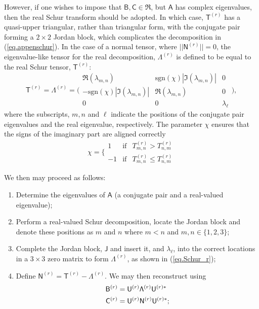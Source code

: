 \documentclass[preprint,amssymb,amsmath,aip,cha]{revtex4-1}
\begin{document}
However, if one wishes to impose that $\mathsf{B}, \mathsf{C} \in \Re$, but $\mathsf{A}$ has complex eigenvalues, then the real Schur transform should be adopted. In which case, $\mathsf{T}^{(r)}$ has a quasi-upper triangular, rather than triangular form, with the conjugate pair forming a $2 \times 2$ Jordan block, which complicates the decomposition in (\ref{eq.appenschur}).  In the case of a normal tensor, where $||\mathsf{N}^{(r)}|| = 0$, the eigenvalue-like tensor for the real decomposition, $\mathsf{\Lambda}^{(r)}$ is defined to be equal to the real Schur tensor, $\mathsf{T}^{(r)}$:
\begin{equation}
\mathsf{T}^{(r)} = \mathsf{\Lambda}^{(r)} = \biggl(\begin{smallmatrix} \Re(\lambda_{m,n}) & \mbox{sgn}(\chi)|\Im(\lambda_{m,n})| & 0\\ -\mbox{sgn}(\chi)|\Im(\lambda_{m,n})| & \Re(\lambda_{m,n}) & 0 \\ 0 & 0 & \lambda_{\ell}\end{smallmatrix} \biggr),
\label{eq.Schur_r}
\end{equation}  
where the subscripts, $m, n$ and $\ell$ indicate the positions of the conjugate pair eigenvalues and the real eigenvalue, respectively. The parameter $\chi$ ensures that the signs of the imaginary part are aligned correctly
\begin{equation}
\chi =  \biggl\{\begin{smallmatrix} 1 & \mbox{if} & T^{(r)}_{m,n} > T^{(r)}_{n,m}\\
-1 & \mbox{if} & T^{(r)}_{m,n} \le T^{(r)}_{n,m}\end{smallmatrix}
\end{equation}

We then may proceed as follows:
\begin{enumerate}
\item Determine the eigenvalues of $\mathsf{A}$ (a conjugate pair and a real-valued eigenvalue);
\item Perform a real-valued Schur decomposition, locate the Jordan block and denote these positions as $m$ and $n$ where $m < n$ and $m,n \in \{1,2,3\}$;
\item Complete the Jordan block, $\mathsf{J}$ and insert it, and $\lambda_{\ell}$, into the correct locations in a $3 \times 3$ zero matrix to form $\mathsf{\Lambda}^{(r)}$, as shown in (\ref{eq.Schur_r}); 
\item Define $\mathsf{N}^{(r)} = \mathsf{T}^{(r)} - \mathsf{\Lambda}^{(r)}$. We may then reconstruct using
\begin{align}
\notag{}
\mathsf{B}^{(r)} &= \mathsf{U}^{(r)}\mathsf{\Lambda}^{(r)}\mathsf{U}^{(r) *} \\
\mathsf{C}^{(r)} &= \mathsf{U}^{(r)}\mathsf{N}^{(r)}\mathsf{U}^{(r) *};
\end{align}
\end{enumerate}
\end{document}
